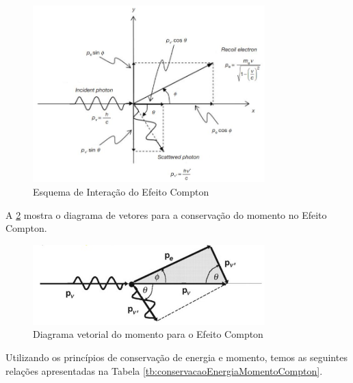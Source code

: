 \documentclass[11pt,a4paper]{article}
\begin{document}
                \begin{figure}[h]
                    \centering
                    \includegraphics[width=0.8\textwidth]{Imagens/esquemaEfeitoCompton.JPG}
                    \caption{Esquema de Interação do Efeito Compton}
                    \label{fig:esquemaEfeitoCompton}
                \end{figure}

            A \ref{fig:diagramaMomentoEfeitoCompton} mostra o diagrama de vetores para a conservação do momento no Efeito Compton.

                \begin{figure}[h]
                    \centering
                    \includegraphics[width=0.8\textwidth]{Imagens/esquemaVetorialMomentoEfeitoCompton.jpg}
                    \caption{Diagrama vetorial do momento para o Efeito Compton}
                    \label{fig:diagramaMomentoEfeitoCompton}
                \end{figure}


            Utilizando os princípios de conservação de energia e momento, temos as seguintes relações apresentadas na Tabela \ref{tb:conservacaoEnergiaMomentoCompton}.
\end{document}
